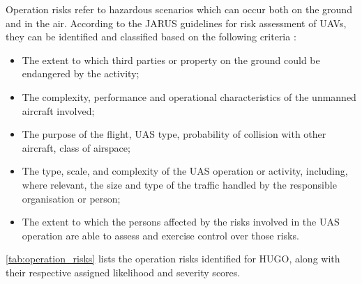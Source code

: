Operation risks refer to hazardous scenarios which can occur both on the ground and in the air. According to the JARUS guidelines for risk assessment of UAVs, they can be identified and classified based on the following criteria \cite{Jarus_main}:
\begin{itemize}
    \item The extent to which third parties or property on the ground could be endangered by the activity;
    \item The complexity, performance and operational characteristics of the unmanned aircraft involved;
    \item The purpose of the flight, UAS type, probability of collision with other aircraft, class of airspace;
    \item The type, scale, and complexity of the UAS operation or activity, including, where relevant, the size and type of the traffic handled by the responsible organisation or person;
    \item The extent to which the persons affected by the risks involved in the UAS operation are able to assess and exercise control over those risks.
\end{itemize}

\autoref{tab:operation_risks} lists the operation risks identified for HUGO, along with their respective assigned likelihood and severity scores.


